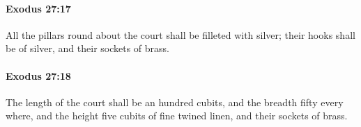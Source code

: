 		\paragraph{Exodus 27:17} %
			\label{EXODUS-27-17}

			All the pillars round about the court shall be filleted with silver; their hooks shall be of silver, and their sockets of brass.


		\paragraph{Exodus 27:18} %
			\label{EXODUS-27-18}

			The length of the court shall be an hundred cubits, and the breadth fifty every where, and the height five cubits of fine twined linen, and their sockets of brass.



